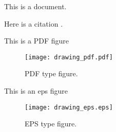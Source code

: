 This is a document.


Here is a citation \cite{Bose_suspension}.

This is a PDF figure 
\begin{figure}[htpb]
    \centering
    \texttt{[image: drawing\_pdf.pdf]}
    \caption{PDF type figure.}
    \label{fig: drawing_pdf}
\end{figure}

This is an eps figure 
\begin{figure}[htpb]
    \centering
    \texttt{[image: drawing\_eps.eps]}
    \caption{EPS type figure.}
    \label{fig: drawing_eps}
\end{figure}
